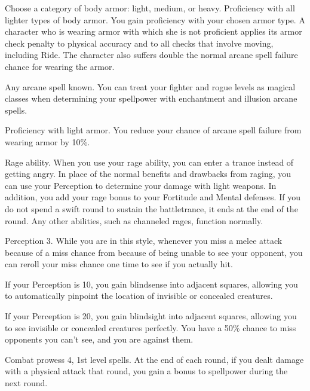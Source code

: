 Choose a category of body armor: light, medium, or heavy.
\featpre Proficiency with all lighter types of body armor.
\featben You gain proficiency with your chosen armor type.
A character who is wearing armor with which she is not proficient applies its armor check penalty to physical accuracy and to all checks that involve moving, including Ride.
The character also suffers double the normal arcane spell failure chance for wearing the armor.

\featpre Any arcane spell known.
\featben You can treat your fighter and rogue levels as magical classes when determining your spellpower with enchantment and illusion arcane spells.

\featpre Proficiency with light armor.
\featben You reduce your chance of arcane spell failure from wearing armor by 10\%.

\featpre Rage ability.
\featben When you use your rage ability, you can enter a trance instead of getting angry.
In place of the normal benefits and drawbacks from raging, you can use your Perception to determine your damage with light weapons.
In addition, you add your rage bonus to your Fortitude and Mental defenses.
If you do not spend a swift round to sustain the battletrance, it ends at the end of the round.
Any other abilities, such as channeled rages, function normally.

\featpre Perception 3.
\featben While you are in this style, whenever you miss a melee attack because of a miss chance from because of being unable to see your opponent, you can reroll your miss chance one time to see if you actually hit.
\par If your Perception is 10, you gain blindsense into adjacent squares, allowing you to automatically pinpoint the location of invisible or concealed creatures.
\par If your Perception is 20, you gain blindsight into adjacent squares, allowing you to see invisible or concealed creatures perfectly.
You have a 50\% chance to miss opponents you can't see, and you are  against them.

\featpres Combat prowess 4, 1st level spells.
\featben At the end of each round, if you dealt damage with a physical attack that round, you gain a  bonus to spellpower during the next round.


